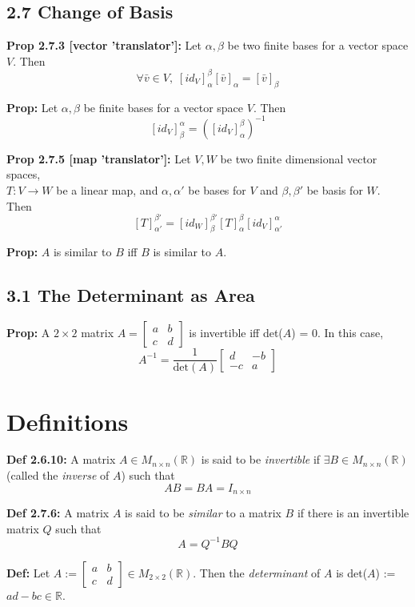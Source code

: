 \pagebreak

\subsection*{2.7 Change of Basis}

\textbf{Prop 2.7.3 [vector 'translator']:} Let $\alpha, \beta$ be two finite bases for a vector space $V$. Then 
\[\forall \bar v \in V, \; [id_V]_\alpha^\beta [\bar v]_\alpha = [\bar v]_\beta\]

\noindent 
\textbf{Prop:} Let $\alpha, \beta$ be finite bases for a vector space $V$. Then 
\[[id_V]_\beta^\alpha = ([id_V]_\alpha^\beta)^{-1}\]

\noindent 
\textbf{Prop 2.7.5 [map 'translator']:} Let $V, W$ be two finite dimensional vector spaces, \\
$T: V \rightarrow W$ be a linear map, and $\alpha, \alpha'$ be bases for $V$ and $\beta, \beta'$ be basis for $W$. 
Then 
\[[T]_{\alpha'}^{\beta'} = [id_W]_\beta^{\beta'}[T]_\alpha^\beta[id_V]_{\alpha'}^\alpha\]

\noindent
\textbf{Prop:} $A$ is similar to $B$ iff $B$ is similar to $A$.

\subsection*{3.1 The Determinant as Area}

\textbf{Prop:} A $2 \times 2$ matrix $A = 
\begin{bmatrix}
    a & b \\ 
    c & d
\end{bmatrix}$
is invertible iff det($A$) = $0$. In this case, 
\[A^{-1} = \frac{1}{\text{det}(A)}
\begin{bmatrix}
    d & -b \\ 
    -c & a
\end{bmatrix}
\] 

\pagebreak

\section*{Definitions}

\textbf{Def 2.6.10:} A matrix $A \in M_{n \times n}(\mathbb{R})$ is said to be \textit{invertible} if $\exists B \in M_{n \times n}(\mathbb{R})$ (called the \textit{inverse} of $A$) such that 
\[AB = BA = I_{n \times n}\]

\bigskip 

\noindent 
\textbf{Def 2.7.6:} A matrix $A$ is said to be \textit{similar} to a matrix $B$ if there is an invertible matrix $Q$ such that \[A = Q^{-1}BQ\]

\bigskip 

\noindent 
\textbf{Def:} Let $A:= 
\begin{bmatrix}
    a & b \\ 
    c & d
\end{bmatrix} 
\in M_{2 \times 2}(\mathbb{R})$. Then the \textit{determinant} of $A$ is det($A$) := $ad - bc \in \mathbb{R}$.